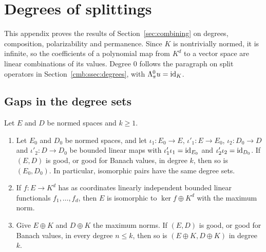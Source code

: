\section{Degrees of splittings}\label{app:degrees}

This appendix proves the results of Section~\ref{sec:combining} on degrees, composition, polarizability and permanence.
Since $K$ is nontrivially normed, it is infinite, so the coefficients of a polynomial map from $K^d$ to a vector space are
linear combinations of its values. Degree $0$ follows the paragraph on split operators in Section~\ref{cmb:ssec:degrees},
with $\Lambda^0_\pi u=\mathrm{id}_K$.

\subsection{Gaps in the degree sets}\label{dgr:ssec:gaps}

\begin{lemma}\label{dgr:lem:lines}
Let $E$ and $D$ be normed spaces and $k\ge1$.
\begin{enumerate}
\item Let $E_0$ and $D_0$ be normed spaces, and let $\iota_1\colon E_0\to E$, $\iota'_1\colon E\to E_0$,
$\iota_2\colon D_0\to D$ and $\iota'_2\colon D\to D_0$ be bounded linear maps with $\iota'_1\iota_1=\mathrm{id}_{E_0}$ and
$\iota'_2\iota_2=\mathrm{id}_{D_0}$. If $(E,D)$ is good, or good for Banach values, in degree $k$, then so is $(E_0,D_0)$. In
particular, isomorphic pairs have the same degree sets.
\item If $f\colon E\to K^d$ has as coordinates linearly independent bounded linear functionals $f_1,\dots,f_d$, then $E$
is isomorphic to $\ker f\oplus K^d$ with the maximum norm.
\item Give $E\oplus K$ and $D\oplus K$ the maximum norms. If $(E,D)$ is good, or good for Banach values, in every degree
$n\le k$, then so is $(E\oplus K,D\oplus K)$ in degree $k$.
\end{enumerate}
\end{lemma}

